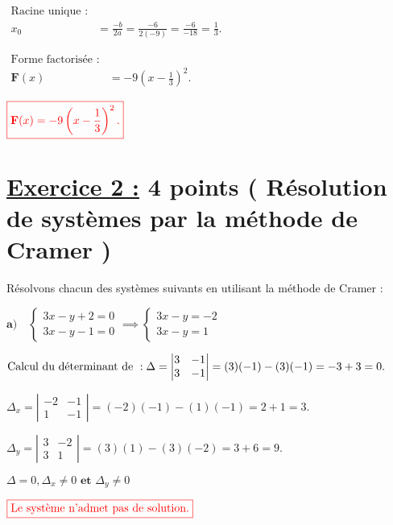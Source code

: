 \documentclass[12pt,a4paper]{article}
\begin{document}
\begin{enumerate}
\(
\begin{aligned}
\text{Racine unique :} \\
x_0 &= \frac{-b}{2a} = \frac{-6}{2(-9)} = \frac{-6}{-18} = \frac{1}{3}.
\end{aligned}
\)

\(
\begin{aligned}
\text{Forme factorisée :} \\
\textbf{F}(x) &= -9(x - \frac{1}{3})^2.
\end{aligned}
\)

\(
\textcolor{red}{\boxed{\textbf{F}(x) = -9\left(x - \frac{1}{3}\right)^2.}}
\)

\end{enumerate}

\section*{\underline{Exercice 2 :} 4 points ( Résolution de systèmes par la méthode de Cramer )}
Résolvons chacun des systèmes suivants en utilisant la méthode de Cramer :

\(\textbf{a)}\quad
\begin{cases}
3x - y + 2 = 0 \\
3x - y - 1 = 0
\end{cases}\implies
\begin{cases}
3x - y = -2 \\
3x - y = 1
\end{cases}
\)


\(
\text{Calcul du déterminant de } : \\
\Delta = \left| \begin{matrix} 3 & -1 \\ 3 & -1 \end{matrix} \right| = (3)(-1) - (3)(-1) = -3 + 3 = 0.
\)

\(
\Delta_{x} = \left| \begin{matrix} -2 & -1 \\ 1 & -1 \end{matrix} \right| = (-2)(-1) - (1)(-1) = 2 + 1 = 3.
\)

\(
\Delta_{y} = \left| \begin{matrix} 3 & -2 \\ 3 & 1 \end{matrix} \right| = (3)(1) - (3)(-2) = 3 + 6 = 9.
\)

\(
\Delta=0, \Delta_{x}\neq 0 \textbf{ et } \Delta_{y}\neq 0
\)

\(
\textcolor{red}{\boxed{\text{Le système n'admet pas de solution.}}}\\
\)
\end{document}
